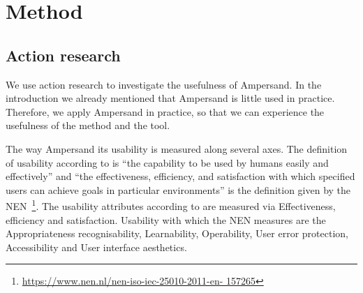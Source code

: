 \newpage
\section{Method} \label{Method}

\subsection{Action research} \label{action_research}

\begin{comment}
Onderzoeksvraag:
Hoe bruikbaar is Ampersand voor het ontwerpen van register-systemen door middel van het analyseren van wet- en regelgeving in de volksgezondheid en in het bijzonder de Wet-BIG
\end{comment}
We use action research to investigate the usefulness of Ampersand.
In the introduction we already mentioned that Ampersand is little used in practice.
Therefore, we apply Ampersand in practice, so that we can experience the usefulness of the method and the tool.

The way Ampersand its usability is measured along several axes.
The definition of usability according to \cite{shackel_usability_2009} is ``the capability to be used by humans easily and effectively'' and ``the effectiveness,
efficiency, and satisfaction with which specified users can achieve goals in particular environments'' is the definition given by the NEN~\footnote{\url{https://www.nen.nl/nen-iso-iec-25010-2011-en- 157265}}.
The usability attributes according to \cite{HORNBAEK200679} are measured via Effectiveness, efficiency and satisfaction.
Usability with which the NEN measures are the Appropriateness recognisability, Learnability, Operability, User error protection, Accessibility and User interface aesthetics.
\begin{comment}
Herkenbaarheid van geschiktheid (Appropriateness recognisability)
    De mate waarin gebruikers kunnen herkennen of een product of systeem geschikt is voor hun behoeften.
Leerbaarheid (Learnability)
    De mate waarin een product of systeem gebruikt kan worden door gespecificeerde gebruikers om gespecificeerde leerdoelen te bereiken met betrekking tot het gebruik van het product of systeem met effectiviteit, efficiëntie, vrijheid van risico en voldoening, in een gespecificeerde gebruikscontext.
Bedienbaarheid (Operability)
    De mate waarin een product of systeem attributen heeft die het makkelijk maken om het te bedienen en beheersen.
Voorkomen gebruikersfouten (User error protection)
    De mate waarin het systeem gebruikers beschermt tegen het maken van fouten.
Volmaaktheid gebruikersinteractie (User interface aesthetics)
    De mate waarin een gebruikersinterface het de gebruiker mogelijk maakt om een plezierige en voldoening gevende interactie te hebben.
Toegankelijkheid (Accessibility)
    De mate waarin een product of systeem gebruikt kan worden door mensen met de meest uiteenlopende eigenschappen en mogelijkheden om een gespecificeerd doel te bereiken in een gespecificeerde gebruikscontext.
\end{comment}

